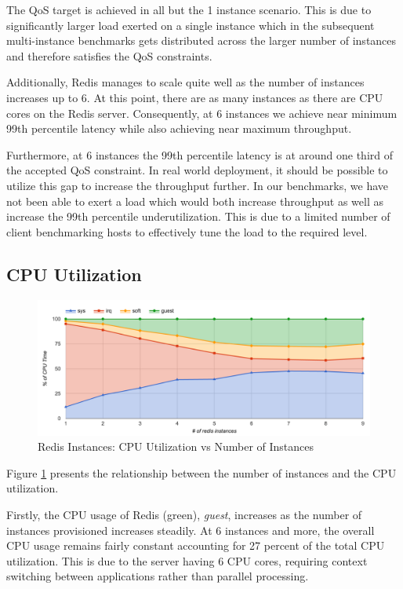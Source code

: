 The QoS target is achieved in all but the 1 instance scenario. This is due to significantly larger load exerted on a single instance which in the subsequent multi-instance benchmarks gets distributed across the larger number of instances and therefore satisfies the QoS constraints.

Additionally, Redis manages to scale quite well as the number of instances increases up to 6. At this point, there are as many instances as there are CPU cores on the Redis server. Consequently, at 6 instances we achieve near minimum 99th percentile latency while also achieving near maximum throughput.

Furthermore, at 6 instances the 99th percentile latency is at around one third of the accepted QoS constraint. In real world deployment, it should be possible to utilize this gap to increase the throughput further. In our benchmarks, we have not been able to exert a load which would both increase throughput as well as increase the 99th percentile underutilization. This is due to a limited number of client benchmarking hosts to effectively tune the load to the required level.


\subsection{CPU Utilization}

\begin{figure}[h]
    \includegraphics[width=\textwidth]{./res/6_instances_cpu.png}
    \caption{Redis Instances: CPU Utilization vs Number of Instances}
    \label{fig:6_instances_cpu.png}
\end{figure}

Figure \ref{fig:6_instances_cpu.png} presents the relationship between the number of instances and the CPU utilization.

Firstly, the CPU usage of Redis (green), \textit{guest}, increases as the number of instances provisioned increases steadily. At 6 instances and more, the overall CPU usage remains fairly constant accounting for 27 percent of the total CPU utilization. This is due to the server having 6 CPU cores, requiring context switching between applications rather than parallel processing.

